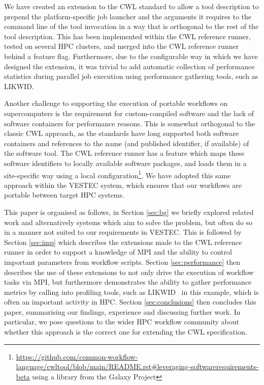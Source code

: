 \documentclass[conference]{IEEEtran}
\begin{document}
We have created an extension to the CWL standard to allow a tool description to prepend the platform-specific job launcher and the arguments it requires to the command line of the tool invocation in a way that is orthogonal to the rest of the tool description. This has been implemented within the CWL reference runner, tested on several HPC clusters, and merged into the CWL reference runner behind a feature flag. Furthermore, due to the configurable way in which we have designed the extension, it was trivial to add automatic collection of performance statistics during parallel job execution using performance gathering tools, such as LIKWID\cite{likwid_paper}.

Another challenge to supporting the execution of portable workflows on supercomputers is the requirement for custom-compiled software and the lack of software containers for performance reasons.
This is somewhat orthogonal to the classic CWL approach, as the standards have long supported both software containers and references to the name (and published identifier, if available) of the software tool. The CWL reference runner has a feature which maps these software identifiers to locally available software packages, and loads them in a site-specific way using a local configuration\footnote{\url{https://github.com/common-workflow-language/cwltool/blob/main/README.rst#leveraging-softwarerequirements-beta} using a library from the Galaxy Project\cite{galaxy}}. We have adopted this same approach within the VESTEC system, which ensures that our workflows are portable between target HPC systems.



This paper is organised as follows, in Section \ref{sec:bg} we briefly explored related work and alternatively systems which aim to solve the problem, but often do so in a manner not suited to our requirements in VESTEC. This is followed by Section \ref{sec:imp} which describes the extensions made to the CWL reference runner in order to support a knowledge of MPI and the ability to control important parameters from workflow scripts. Section \ref{sec:performance} then describes the use of these extensions to not only drive the execution of workflow tasks via MPI, but furthermore demonstrates the ability to gather performance metrics by calling into profiling tools, such as LIKWID~\cite{likwid_paper} in this example, which is often an important activity in HPC. Section \ref{sec:conclusions} then concludes this paper, summarising our findings, experience and discussing further work. In particular, we pose questions to the wider HPC workflow community about whether this approach is the correct one for extending the CWL specification.
\end{document}
